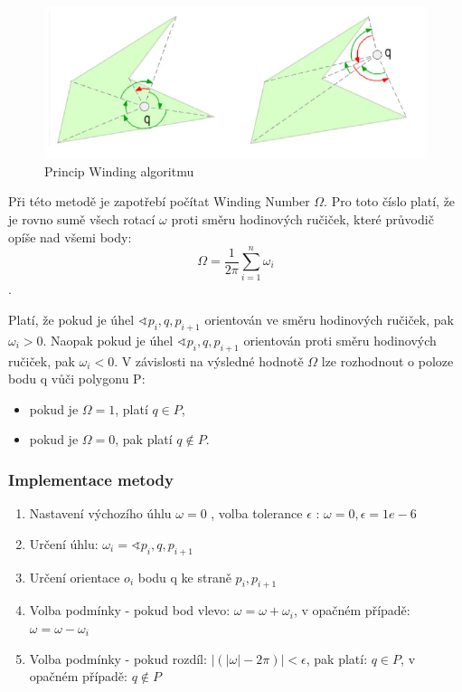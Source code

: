 \documentclass[a4paper,11pt,twoside]{article}
\begin{document}
\vspace{0.2cm}
\begin{figure}[hbt!] 
\begin{center}
\includegraphics[width=15cm]{pictures/winding.png} 
\caption[Princip Winding algoritmu]{Princip Winding algoritmu \cite{winding}}
\label{fig:winding}
\end{center}
\end{figure}
\vspace{-0.4cm}

\noindent Při této metodě je zapotřebí počítat Winding Number $\Omega$. Pro toto číslo platí, že je rovno sumě všech rotací $\omega$ proti směru hodinových ručiček, které průvodič opíše nad všemi body: 
$$ 
\Omega = \frac{1}{2\pi} \sum_{i=1}^n \omega_i
$$.

\noindent Platí, že pokud je úhel $\sphericalangle p_i, q, p_{i+1}$ orientován ve směru hodinových ručiček, pak $\omega_i > 0$.
Naopak pokud je úhel $\sphericalangle p_i, q, p_{i+1}$ orientován proti směru hodinových ručiček, pak $\omega_i < 0$. V závislosti na výsledné hodnotě $\Omega$ lze rozhodnout o poloze bodu q vůči polygonu P:

\begin{itemize}
\item pokud je $\Omega = 1$, platí $q \in P$, 
\item pokud je $\Omega = 0$, pak platí $q { \not \in } P$.
\end{itemize}

\newpage
\vspace*{-1cm}
\subsubsection{Implementace metody}
\begin{enumerate}
\item Nastavení výchozího úhlu $\omega = 0$ , volba tolerance $\epsilon$ : $\omega = 0, \epsilon = 1e-6$
\item Určení úhlu: $\omega_i = \sphericalangle p_i, q, p_{i+1}$
\item Určení orientace $o_i$ bodu q ke straně $p_i, p_{i+1}$
\item Volba podmínky - pokud bod vlevo: $\omega = \omega + \omega_i$, v opačném případě: $\omega = \omega - \omega_i$
\item Volba podmínky - pokud rozdíl: $|(|\omega| - 2\pi)| < \epsilon$, pak platí: $q \in P$, v opačném případě:  $ q { \not \in } P $
\end{enumerate}
\end{document}
